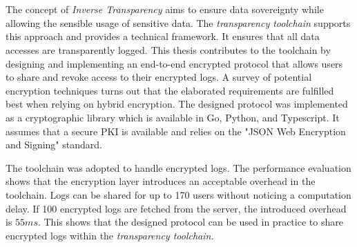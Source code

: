 \documentclass[../main.tex]{subfiles}
\begin{document}
\chapter*{\myAbstractTitle}

The concept of \emph{Inverse Transparency} aims to ensure data sovereignty while allowing the sensible usage of sensitive data.
The \emph{transparency toolchain} supports this approach and provides a technical framework.
It ensures that all data accesses are transparently logged.
This thesis contributes to the toolchain by designing and implementing an end-to-end encrypted protocol that allows users to share and revoke access to their encrypted logs.
A survey of potential encryption techniques turns out that the elaborated requirements are fulfilled best when relying on hybrid encryption.
The designed protocol was implemented as a cryptographic library which is available in Go, Python, and Typescript.
It assumes that a secure PKI is available and relies on the "JSON Web Encryption and Signing" standard.

The toolchain was adopted to handle encrypted logs.
The performance evaluation shows that the encryption layer introduces an acceptable overhead in the toolchain.
Logs can be shared for up to 170 users without noticing a computation delay.
If 100 encrypted logs are fetched from the server, the introduced overhead is $55ms$.
This shows that the designed protocol can be used in practice to share encrypted logs within the \emph{transparency toolchain}.
\end{document}
